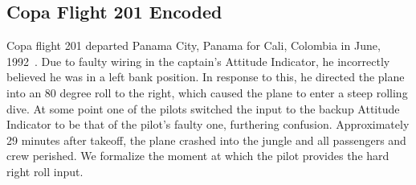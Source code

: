 \noindent
\subsection{Copa Flight 201 Encoded}

Copa flight 201 departed Panama City, Panama for Cali, Colombia in June, 1992~\cite{copa}. Due to faulty wiring in the captain's Attitude Indicator, he incorrectly believed he was in a left bank position. In response to this, he directed the plane into an 80 degree roll to the right, which caused the plane to enter a steep rolling dive. At some point one of the pilots switched the input to the backup Attitude Indicator to be that of the pilot's faulty one, furthering confusion. Approximately 29 minutes after takeoff, the plane crashed into the jungle and all passengers and crew perished. We formalize the moment at which the pilot provides the hard right roll input.

